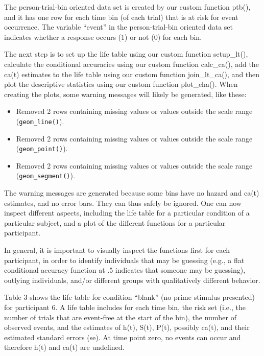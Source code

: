 \documentclass[
  man, donotrepeattitle,floatsintext]{apa6}
\providecommand{\tightlist}{%
  \setlength{\itemsep}{0pt}\setlength{\parskip}{0pt}}
\begin{document}
The person-trial-bin oriented data set is created by our custom function ptb(), and it has one row for each time bin (of each trial) that is at risk for event occurrence. The variable ``event'' in the person-trial-bin oriented data set indicates whether a response occurs (1) or not (0) for each bin.

The next step is to set up the life table using our custom function setup\_lt(), calculate the conditional accuracies using our custom function calc\_ca(), add the ca(t) estimates to the life table using our custom function join\_lt\_ca(), and then plot the descriptive statistics using our custom function plot\_eha(). When creating the plots, some warning messages will likely be generated, like these:

\begin{itemize}
\tightlist
\item
  Removed 2 rows containing missing values or values outside the scale range (\texttt{geom\_line()}).
\item
  Removed 2 rows containing missing values or values outside the scale range (\texttt{geom\_point()}).
\item
  Removed 2 rows containing missing values or values outside the scale range (\texttt{geom\_segment()}).
\end{itemize}

The warning messages are generated because some bins have no hazard and ca(t) estimates, and no error bars. They can thus safely be ignored.
One can now inspect different aspects, including the life table for a particular condition of a particular subject, and a plot of the different functions for a particular participant.

In general, it is important to visually inspect the functions first for each participant, in order to identify individuals that may be guessing (e.g., a flat conditional accuracy function at .5 indicates that someone may be guessing), outlying individuals, and/or different groups with qualitatively different behavior.

Table 3 shows the life table for condition ``blank'' (no prime stimulus presented) for participant 6. A life table includes for each time bin, the risk set (i.e., the number of trials that are event-free at the start of the bin), the number of observed events, and the estimates of h(t), S(t), P(t), possibly ca(t), and their estimated standard errors (se). At time point zero, no events can occur and therefore h(t) and ca(t) are undefined.
\end{document}
